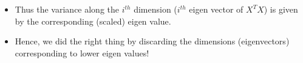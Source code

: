 \begin{frame}
  \begin{overlayarea}{\textwidth}{\textheight}
    \vspace{-0.25cm}
    \vspace{-0.1cm}
    \vspace{-0.3cm}
    \begin{itemize}\justifying
      \item<7-> Thus the variance along the $i^{th}$ dimension ($i^{th}$ eigen vector of $X^T X$) is given by the corresponding (scaled) eigen value.
      \item<8-> Hence, we did the right thing by discarding the dimensions (eigenvectors) corresponding to lower eigen values!
    \end{itemize}

  \end{overlayarea}
\end{frame}

